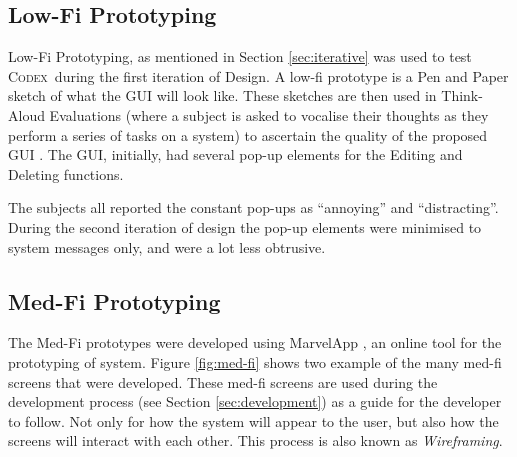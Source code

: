 \documentclass[progress]{cmpreport}
\newcommand{\Codex}{\textsc{Codex}}
\begin{document}
		\subsection{Low-Fi Prototyping} \label{sec:low-fi}
		Low-Fi Prototyping, as mentioned in Section \ref{sec:iterative} was used to test \Codex \ during the first iteration of Design. A low-fi prototype is a Pen and Paper sketch of what the GUI will look like. These sketches are then used in Think-Aloud Evaluations (where a subject is asked to vocalise their thoughts as they perform a series of tasks on a system) to ascertain the quality of the proposed GUI \citep{thinkaloud}. The GUI, initially, had several pop-up elements for the Editing and Deleting functions. 
		
		The subjects all reported the constant pop-ups as ``annoying'' and ``distracting''. During the second iteration of design the pop-up elements were minimised to system messages only, and were a lot less obtrusive.
	
		\subsection{Med-Fi Prototyping} \label{sec:med-fi}
		The Med-Fi prototypes were developed using MarvelApp \citep{marvelapp}, an online tool for the prototyping of system. Figure \ref{fig:med-fi} shows two example of the many med-fi screens that were developed. These med-fi screens are used during the development process (see Section \ref{sec:development}) as a guide for the developer to follow. Not only for how the system will appear to the user, but also how the screens will interact with each other. This process is also known as \emph{Wireframing}.
		
\end{document}
